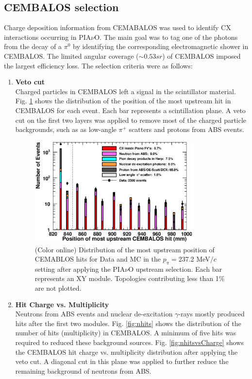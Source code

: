 \subsection{CEMBALOS selection}
Charge deposition information from CEMABALOS was used to identify CX interactions occurring in PIA$\nu$O. The main goal was to tag one of the photons from the decay of a $\pi^0$ by identifying the corresponding electromagnetic shower in CEMBALOS. The limited angular coverage ($\sim0.53 sr$) of CEMBALOS imposed the largest efficiency loss. The selection criteria were as follows:
\begin{enumerate}
\item{\bf Veto cut\\}
Charged particles in CEMBALOS left a signal in the scintillator material. Fig. \ref{fig:veto} shows the distribution of the position of the most upstream hit in CEMBALOS for each event. Each bar represents a scintillation plane. A veto cut on the first two layers was applied to remove most of the charged particle backgrounds, such as as low-angle $\pi^+$ scatters and protons from ABS events.

\begin{figure}[ht]
 \includegraphics[width=86mm]{figures/duettag_fgdMostUp_10000_forpaper_v2.eps}
 \caption{(Color online) Distribution of the most upstream position of CEMABLOS hits for Data and MC in the $p_\pi=$237.2 MeV$/c$ setting after applying the PIA$\nu$O upstream selection. Each bar represents an XY module. Topologies contributing less than 1\% are not plotted.}
 \label{fig:veto}
\end{figure}
   
\item{\bf Hit Charge vs. Multiplicity\\}
Neutrons from ABS events and nuclear de-excitation $\gamma$-rays mostly produced hits after the first two modules. Fig. \ref{fig:nhits} shows the distribution of the number of hits (multiplicity) in CEMBALOS. A minimum of five hits was required to reduced these background sources. Fig. \ref{fig:nhitsvsCharge} shows the CEMBALOS hit charge vs. multiplicity distribution after applying the veto cut. A diagonal cut in this plane was applied to further reduce the remaining background of neutrons from ABS.
\end{enumerate}

